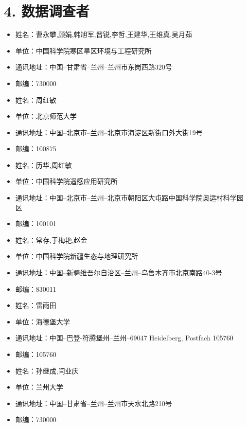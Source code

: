 \documentclass[letterpaper,10pt,english]{sphinxmanual}
\begin{document}
\section{4.      数据调查者}
\label{fecd46b0-3390-4580-a415-2d49ba77f9bd:id4}\begin{itemize}
\item {} 
姓名：曹永攀,顾娟,韩旭军,晋锐,李哲,王建华,王维真,吴月茹

\item {} 
单位：中国科学院寒区旱区环境与工程研究所

\item {} 
通讯地址：中国--甘肃省--兰州--兰州市东岗西路320号

\item {} 
邮编：730000

\item {} 
姓名：周红敏

\item {} 
单位：北京师范大学

\item {} 
通讯地址：中国--北京市--兰州--北京市海淀区新街口外大街19号

\item {} 
邮编：100875

\item {} 
姓名：历华,周红敏

\item {} 
单位：中国科学院遥感应用研究所

\item {} 
通讯地址：中国--北京市--兰州--北京市朝阳区大屯路中国科学院奥运村科学园区

\item {} 
邮编：100101

\item {} 
姓名：常存,于梅艳,赵金

\item {} 
单位：中国科学院新疆生态与地理研究所

\item {} 
通讯地址：中国--新疆维吾尔自治区--兰州--乌鲁木齐市北京南路40-3号

\item {} 
邮编：830011

\item {} 
姓名：雷雨田

\item {} 
单位：海德堡大学

\item {} 
通讯地址：中国--巴登-符腾堡州--兰州--69047 Heidelberg, Postfach 105760

\item {} 
邮编：105760

\item {} 
姓名：孙继成,闫业庆

\item {} 
单位：兰州大学

\item {} 
通讯地址：中国--甘肃省--兰州--兰州市天水北路210号

\item {} 
邮编：730000

\end{itemize}
\end{document}

